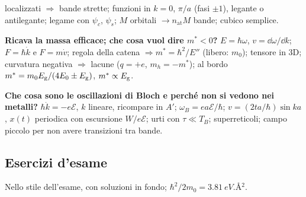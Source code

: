 \documentclass[11pt,a4paper]{article}
\begin{document}
\begin{domande}
localizzati $\Rightarrow$ bande strette; funzioni in $k=0$, $\pi/a$ (fasi $\pm1$), legante o antilegante; legame con $\psi_c$, $\psi_s$; $M$ orbitali $\to n_{\mathrm{at}}M$
bande; cubico semplice.
\item \textbf{Ricava la massa efficace; che cosa vuol dire $m^*<0$?} $E=\hbar\omega$, $v=\dd\omega/\dd k$; $F=\hbar\dot k$ e $F=m\dot v$; regola della catena
$\Rightarrow m^*=\hbar^2/E''$ (libero: $m_0$); tensore in 3D; curvatura negativa $\Rightarrow$ lacune ($q=+e$, $m_h=-m^*$); al bordo $m^*=m_0E_{\mathrm g}/(4E_0\pm E_{\mathrm g})$, $m^*\propto E_{\mathrm g}$.
\item \textbf{Che cosa sono le oscillazioni di Bloch e perché non si vedono nei metalli?} $\hbar\dot k=-e\mathcal E$, $k$ lineare, ricompare in $A'$; $\omega_B=ea\mathcal E/\hbar$;
$v=(2ta/\hbar)\sin ka$, $x(t)$ periodica con escursione $W/e\mathcal E$; urti con $\tau\ll T_B$; superreticoli; campo piccolo per non avere transizioni tra bande.
\end{domande}

\subsection*{Esercizi d'esame}
Nello stile dell'esame, con soluzioni in fondo; $\hbar^2/2m_0=\SI{3.81}{eV.\angstrom^2}$.
\end{document}
